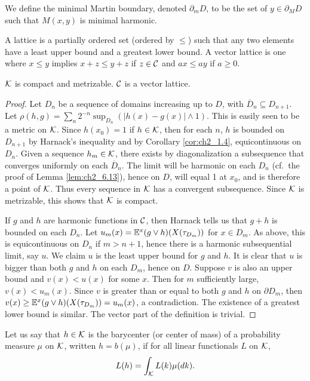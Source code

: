 We define the minimal Martin boundary, denoted $\partial_m D$, to be the set of $y \in \partial_M D$ such that $M(x,y)$ is minimal harmonic.

A lattice is a partially ordered set (ordered by $\leq$) such that any two elements have a least upper bound and a greatest lower bound. A vector lattice is one where $x \leq y$ implies $x + z \leq y + z$ if $z \in \mathcal{C}$ and $ax \leq ay$ if $a \geq 0$.

\begin{proposition}\label{prop:ch2_7.7}
$\mathcal{K}$ is compact and metrizable. $\mathcal{C}$ is a vector lattice.
\end{proposition}

\begin{proof}
Let $D_n$ be a sequence of domains increasing up to $D$, with $\overline{D}_n \subseteq D_{n+1}$. Let $\rho(h,g) = \sum_n 2^{-n}\sup_{D_n}(|h(x)-g(x)| \wedge 1)$. This is easily seen to be a metric on $\mathcal{K}$. Since $h(x_0) = 1$ if $h \in \mathcal{K}$, then for each $n$, $h$ is bounded on $D_{n+1}$ by Harnack's inequality and by Corollary \ref{cor:ch2_1.4}, equicontinuous on $D_n$. Given a sequence $h_m \in \mathcal{K}$, there exists by diagonalization a subsequence that converges uniformly on each $\overline{D}_n$. The limit will be harmonic on each $D_n$ (cf.\ the proof of Lemma \ref{lem:ch2_6.13}), hence on $D$, will equal 1 at $x_0$, and is therefore a point of $\mathcal{K}$. Thus every sequence in $\mathcal{K}$ has a convergent subsequence. Since $\mathcal{K}$ is metrizable, this shows that $\mathcal{K}$ is compact.

If $g$ and $h$ are harmonic functions in $\mathcal{C}$, then Harnack tells us that $g+h$ is bounded on each $D_n$. Let $u_m(x) = \mathbb{E}^x(g \vee h)(X(\tau_{D_m}))$ for $x \in D_m$. As above, this is equicontinuous on $D_n$ if $m > n+1$, hence there is a harmonic subsequential limit, say $u$. We claim $u$ is the least upper bound for $g$ and $h$. It is clear that $u$ is bigger than both $g$ and $h$ on each $D_m$, hence on $D$. Suppose $v$ is also an upper bound and $v(x) < u(x)$ for some $x$. Then for $m$ sufficiently large, $v(x) < u_m(x)$. Since $v$ is greater than or equal to both $g$ and $h$ on $\partial D_m$, then $v(x) \geq \mathbb{E}^x(g \vee h)(X(\tau_{D_m})) = u_m(x)$, a contradiction. The existence of a greatest lower bound is similar. The vector part of the definition is trivial.
\end{proof}

\begin{definition}\label{def:ch2_7.8}
Let us say that $h \in \mathcal{K}$ is the barycenter (or center of mass) of a probability measure $\mu$ on $\mathcal{K}$, written $h = b(\mu)$, if for all linear functionals $L$ on $\mathcal{K}$,
\mpagebreak
\[
    L(h) = \int_{\mathcal{K}} L(k)\mu(dk).
\]
\end{definition}

